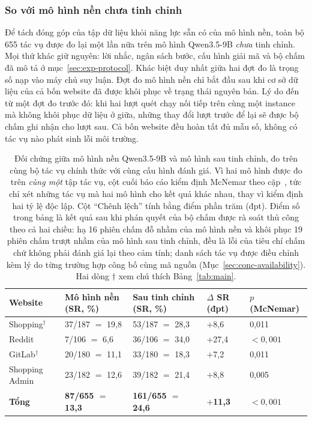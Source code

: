 \subsubsection{So với mô hình nền chưa tinh chỉnh}
\label{sec:exp-baseline}

Để tách đóng góp của tập dữ liệu khỏi năng lực sẵn có của mô hình nền, toàn bộ 655 tác vụ được đo lại một lần nữa trên mô hình Qwen3.5-9B \emph{chưa} tinh chỉnh. Mọi thứ khác giữ nguyên: lời nhắc, ngân sách bước, cấu hình giải mã và bộ chấm đã mô tả ở mục~\ref{sec:exp-protocol}. Khác biệt duy nhất giữa hai đợt đo là trọng số nạp vào máy chủ suy luận. Đợt đo mô hình nền chỉ bắt đầu sau khi cơ sở dữ liệu của cả bốn website đã được khôi phục về trạng thái nguyên bản. Lý do đến từ một đợt đo trước đó: khi hai lượt quét chạy nối tiếp trên cùng một instance mà không khôi phục dữ liệu ở giữa, những thay đổi lượt trước để lại sẽ được bộ chấm ghi nhận cho lượt sau. Cả bốn website đều hoàn tất đủ mẫu số, không có tác vụ nào phát sinh lỗi môi trường.

\begin{table}[htbp]
  \centering
  \caption[Đối chứng mô hình nền và mô hình sau tinh chỉnh]{Đối chứng giữa mô
    hình nền Qwen3.5-9B và mô hình sau tinh chỉnh, đo trên cùng bộ tác vụ chính
    thức với cùng cấu hình đánh giá. Vì hai mô hình được đo trên \emph{cùng một}
    tập tác vụ, cột cuối báo cáo kiểm định McNemar theo
    cặp~\cite{mcnemar1947}, tức chỉ xét những tác vụ mà hai mô hình cho kết quả
    khác nhau, thay vì kiểm định hai tỷ lệ độc lập. Cột ``Chênh lệch'' tính bằng
    điểm phần trăm (đpt). Điểm số trong bảng là kết quả sau khi phán quyết của
    bộ chấm được rà soát thủ công theo cả hai chiều: hạ 16 phiên chấm đỗ nhầm của
    mô hình nền và khôi phục 19 phiên chấm trượt nhầm của mô hình sau tinh chỉnh,
    đều là lỗi của tiêu chí chấm chứ không phải đánh giá lại theo cảm tính; danh
    sách tác vụ được điều chỉnh kèm lý do từng trường hợp công bố cùng mã nguồn
    (Mục~\ref{sec:conc-availability}). Hai dòng $\dagger$ xem chú thích
  Bảng~\ref{tab:main}.}
  \label{tab:baseline}
  \small
  \begin{tabular}{@{}L{2.9cm} R{2.7cm} R{2.7cm} R{2.0cm} R{2.2cm}@{}}
    \toprule
    \textbf{Website} & \textbf{Mô hình nền (SR, \%)} & \textbf{Sau tinh chỉnh (SR, \%)} &
    \textbf{$\Delta$ SR (đpt)} & \textbf{$p$ (McNemar)} \\
    \midrule
    Shopping$^\dagger$ & 37/187 $=$ 19{,}8 & 53/187 $=$ 28{,}3 & $+$8{,}6 & 0{,}011 \\
    Reddit & 7/106 $=$ 6{,}6 & 36/106 $=$ 34{,}0 & $+$27{,}4 & $<0{,}001$ \\
    GitLab$^\dagger$ & 20/180 $=$ 11{,}1 & 33/180 $=$ 18{,}3 & $+$7{,}2 & 0{,}011 \\
    Shopping Admin & 23/182 $=$ 12{,}6 & 39/182 $=$ 21{,}4 & $+$8{,}8 & 0{,}005 \\
    \midrule
    \textbf{Tổng} & \textbf{87/655 $=$ 13{,}3} & \textbf{161/655 $=$ 24{,}6} &
    \textbf{$+$11{,}3} & \textbf{$<0{,}001$} \\
    \bottomrule
  \end{tabular}
\end{table}

